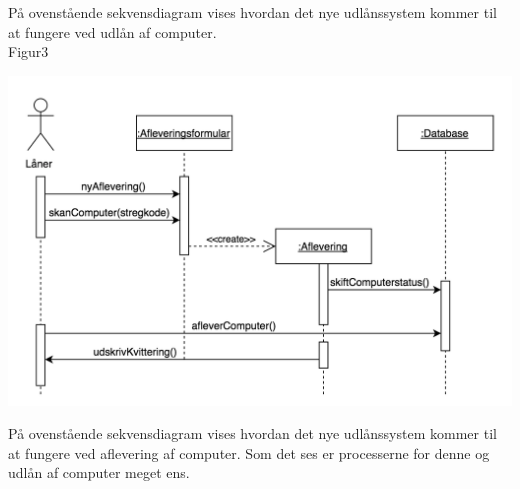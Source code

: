 \documentclass[a4paper]{article}
\begin{document}
På ovenstående sekvensdiagram vises hvordan det nye udlånssystem kommer til at fungere ved udlån af computer. \\
Figur3\\
\centerline{\includegraphics[scale=0.5]{Sekvensdiagram3.png}}
På ovenstående sekvensdiagram vises hvordan det nye udlånssystem kommer til at fungere ved aflevering af computer. Som det ses er processerne for denne og udlån af computer meget ens.
\newpage
\end{document}
